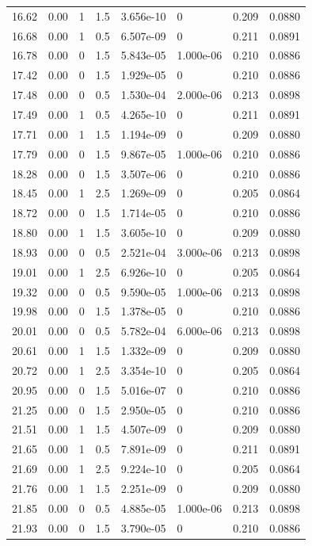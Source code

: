 \documentclass[preview]{standalone}
\begin{document}
{{{\begin{tabular}{L{1.2cm}C{1.2cm} C{0.3cm}C{0.5cm} C{1.4cm}C{1.4cm} C{1.4cm}C{1.4cm}}
  16.62  &  0.00  & 1     & 1.5 &  3.656e-10  & 0  & 0.209 &  0.0880   \\ 
  16.68  &  0.00  & 1     & 0.5 &  6.507e-09  & 0  & 0.211 &  0.0891   \\ 
  16.78  &  0.00  & 0     & 1.5 &  5.843e-05  & 1.000e-06  & 0.210 &  0.0886   \\ 
  17.42  &  0.00  & 0     & 1.5 &  1.929e-05  & 0  & 0.210 &  0.0886   \\ 
  17.48  &  0.00  & 0     & 0.5 &  1.530e-04  & 2.000e-06  & 0.213 &  0.0898   \\ 
  17.49  &  0.00  & 1     & 0.5 &  4.265e-10  & 0  & 0.211 &  0.0891   \\ 
  17.71  &  0.00  & 1     & 1.5 &  1.194e-09  & 0  & 0.209 &  0.0880   \\ 
  17.79  &  0.00  & 0     & 1.5 &  9.867e-05  & 1.000e-06  & 0.210 &  0.0886   \\ 
  18.28  &  0.00  & 0     & 1.5 &  3.507e-06  & 0  & 0.210 &  0.0886   \\ 
  18.45  &  0.00  & 1     & 2.5 &  1.269e-09  & 0  & 0.205 &  0.0864   \\ 
  18.72  &  0.00  & 0     & 1.5 &  1.714e-05  & 0  & 0.210 &  0.0886   \\ 
  18.80  &  0.00  & 1     & 1.5 &  3.605e-10  & 0  & 0.209 &  0.0880   \\ 
  18.93  &  0.00  & 0     & 0.5 &  2.521e-04  & 3.000e-06  & 0.213 &  0.0898   \\ 
  19.01  &  0.00  & 1     & 2.5 &  6.926e-10  & 0  & 0.205 &  0.0864   \\ 
  19.32  &  0.00  & 0     & 0.5 &  9.590e-05  & 1.000e-06  & 0.213 &  0.0898   \\ 
  19.98  &  0.00  & 0     & 1.5 &  1.378e-05  & 0  & 0.210 &  0.0886   \\ 
  20.01  &  0.00  & 0     & 0.5 &  5.782e-04  & 6.000e-06  & 0.213 &  0.0898   \\ 
  20.61  &  0.00  & 1     & 1.5 &  1.332e-09  & 0  & 0.209 &  0.0880   \\ 
  20.72  &  0.00  & 1     & 2.5 &  3.354e-10  & 0  & 0.205 &  0.0864   \\ 
  20.95  &  0.00  & 0     & 1.5 &  5.016e-07  & 0  & 0.210 &  0.0886   \\ 
  21.25  &  0.00  & 0     & 1.5 &  2.950e-05  & 0  & 0.210 &  0.0886   \\ 
  21.51  &  0.00  & 1     & 1.5 &  4.507e-09  & 0  & 0.209 &  0.0880   \\ 
  21.65  &  0.00  & 1     & 0.5 &  7.891e-09  & 0  & 0.211 &  0.0891   \\ 
  21.69  &  0.00  & 1     & 2.5 &  9.224e-10  & 0  & 0.205 &  0.0864   \\ 
  21.76  &  0.00  & 1     & 1.5 &  2.251e-09  & 0  & 0.209 &  0.0880   \\ 
  21.85  &  0.00  & 0     & 0.5 &  4.885e-05  & 1.000e-06  & 0.213 &  0.0898   \\ 
  21.93  &  0.00  & 0     & 1.5 &  3.790e-05  & 0  & 0.210 &  0.0886   \\ 
\hline 
\end{tabular} 

}}}
\end{document}
